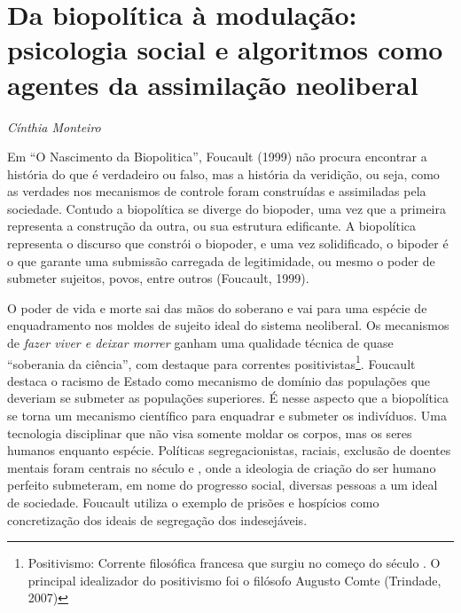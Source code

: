 \chapter{Da biopolítica à modulação: psicologia social e algoritmos como agentes da assimilação neoliberal}

\begin{flushright}
\emph{Cínthia Monteiro}
\end{flushright}

Em ``O Nascimento da Biopolitica'', Foucault (1999) não procura
encontrar a história do que é verdadeiro ou falso, mas a história da
veridição, ou seja, como as verdades nos mecanismos de controle foram
construídas e assimiladas pela sociedade. Contudo a biopolítica se
diverge do biopoder, uma vez que a primeira representa a construção da
outra, ou sua estrutura edificante. A biopolítica representa o discurso
que constrói o biopoder, e uma vez solidificado, o bipoder é o que
garante uma submissão carregada de legitimidade, ou mesmo o poder de
submeter sujeitos, povos, entre outros (Foucault, 1999).

O poder de vida e morte sai das mãos do soberano e vai para uma espécie
de enquadramento nos moldes de sujeito ideal do sistema neoliberal. Os
mecanismos de \emph{fazer viver e deixar morrer} ganham uma qualidade
técnica de quase ``soberania da ciência'', com destaque para correntes
positivistas\footnote{Positivismo: Corrente filosófica francesa que
  surgiu no começo do século . O principal idealizador do positivismo
  foi o filósofo Augusto Comte (Trindade, 2007)}. Foucault destaca o
racismo de Estado como mecanismo de domínio das populações que deveriam
se submeter as populações superiores. É nesse aspecto que a biopolítica
se torna um mecanismo científico para enquadrar e submeter os
indivíduos. Uma tecnologia disciplinar que não visa somente moldar os
corpos, mas os seres humanos enquanto espécie. Políticas
segregacionistas, raciais, exclusão de doentes mentais foram centrais no
século  e , onde a ideologia de criação do ser humano perfeito
submeteram, em nome do progresso social, diversas pessoas a um
ideal de sociedade. Foucault utiliza o exemplo de prisões e hospícios
como concretização dos ideais de segregação dos indesejáveis.


